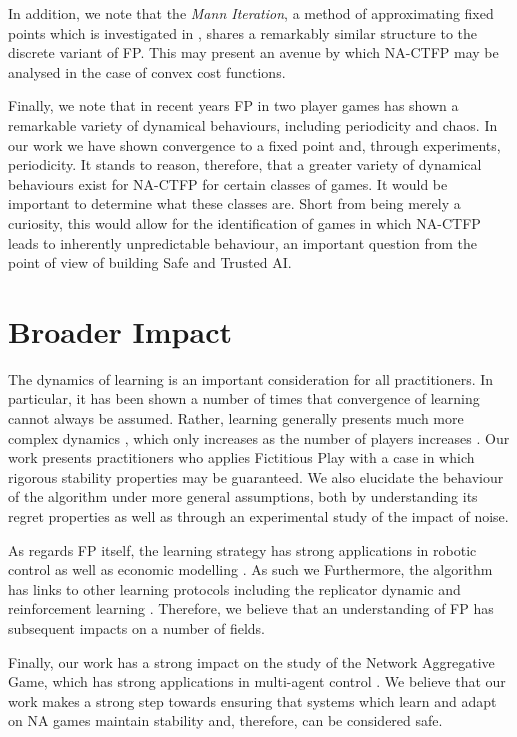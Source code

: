 \documentclass{article}
\theoremstyle{definition}
\begin{document}
	In addition, we note that the \emph{Mann Iteration}, a method of approximating fixed points which is investigated in \cite{Parise2020}, shares a remarkably similar structure to the discrete variant of FP. This may present an avenue by which NA-CTFP may be analysed in the case of convex cost functions. 
	
	Finally, we note that in recent years FP in two player games has shown a remarkable variety of dynamical behaviours, including periodicity and chaos. In our work we have shown convergence to a fixed point and, through experiments, periodicity. It stands to reason, therefore, that a greater variety of dynamical behaviours exist for NA-CTFP for certain classes of games. It would be important to determine what these classes are. Short from being merely a curiosity, this would allow for the identification of games in which NA-CTFP leads to inherently unpredictable behaviour, an important question from the point of view of building Safe and Trusted AI.

\section*{Broader Impact}

The dynamics of learning is an important consideration for all practitioners. In particular, it has
been shown a number of times \cite{noneqmbehaviour} that convergence of learning cannot always be
assumed. Rather, learning generally presents much more complex dynamics \cite{gallaandfarmer}, which
only increases as the number of players increases \cite{sanders}. Our work presents practitioners
who applies Fictitious Play with a case in which rigorous stability properties may be guaranteed.
We also elucidate the behaviour of the algorithm under more general assumptions, both by
understanding its regret properties as well as through an experimental study of the impact of noise.

As regards FP  itself, the learning strategy has strong applications in robotic control
\cite{Smyrnakis, Hernandez, Sharma} as well as economic modelling \cite{vonNeumann}. As such we
Furthermore, the algorithm has links to other learning protocols including the replicator dynamic
\cite{Benaim} and reinforcement learning \cite{LeslieandCollins}. Therefore, we believe that an
understanding of FP has subsequent impacts on a number of fields.

Finally, our work has a strong impact on the study of the Network Aggregative Game, which has strong
applications in multi-agent control \cite{GrammaticoAggregativeControl}. We 
believe that our work makes a strong step towards ensuring that systems which learn and adapt on
NA games maintain stability and, therefore, can be considered safe.
\end{document}
